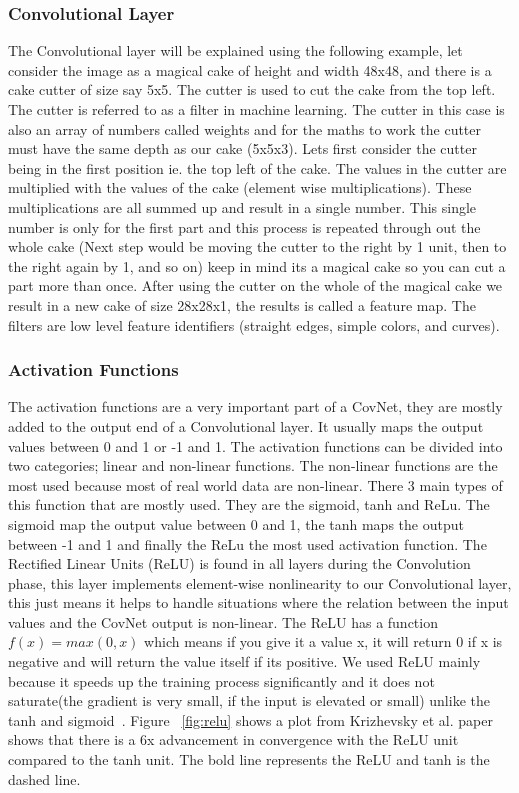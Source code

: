 \documentclass[12pt, a4paper,oneside]{report}
\begin{document}
\subsubsection{Convolutional Layer}
The Convolutional layer will be explained using the following example, let consider the image as a magical cake of height and width 48x48, and there is a cake cutter of size say 5x5. The cutter is used to cut the cake from the top left. The cutter is referred to as a filter in machine learning. The cutter in this case is also an array of numbers called weights and for the maths to work the cutter must have the same depth as our cake (5x5x3).
Lets first consider the cutter being in the first position ie. the top left of the cake. The values in the cutter are multiplied with the values of the cake (element wise multiplications). These multiplications are all summed up and result in a single number. This single number is only for the first part and this process is repeated through out the whole cake (Next step would be moving the cutter to the right by 1 unit, then to the right again by 1, and so on) keep in mind its a magical cake so you can cut a part more than once. After using the cutter on the whole of the magical cake we result in a new cake of size 28x28x1, the results is called a feature map. The filters are low level feature identifiers (straight edges, simple colors, and curves). 


\subsubsection{Activation Functions}
The activation functions are a very important part of a CovNet, they are mostly added to the output end of a Convolutional layer. It usually maps the output values between 0 and 1 or -1 and 1. The activation functions can be divided into two categories; linear and non-linear functions. The non-linear functions are the most used because most of real world data are non-linear. There 3 main types of this function that are mostly used. They are the sigmoid, tanh and ReLu. The sigmoid map the output value between 0 and 1, the tanh maps the output between -1 and 1 and finally the ReLu the most used activation function. The Rectified Linear Units (ReLU) is found in all layers during the Convolution phase, this layer implements element-wise nonlinearity to our Convolutional layer, this just means it helps to handle situations where the relation between the input values and the CovNet output is non-linear. The ReLU has a function \(f(x) = max(0,x)\) which means if you give it a value x, it will return 0 if x is negative and will return the value itself if its positive. We used ReLU mainly because it speeds up the training process significantly and it does not saturate(the gradient is very small, if the input is elevated or small) unlike the tanh and sigmoid~\cite{relu}. Figure ~\ref{fig:relu} shows a plot from Krizhevsky et al. \cite{krizhevsky2012imagenet} paper shows that there is a 6x advancement in convergence with the ReLU unit compared to the tanh unit. The bold line represents the ReLU and tanh is the dashed line.
\end{document}
